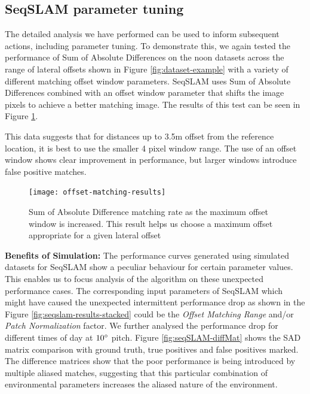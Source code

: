 \documentclass[letterpaper, 10 pt, conference]{ieeeconf}  %
\begin{document}
\subsection{SeqSLAM parameter tuning}

The detailed analysis we have performed can be used to inform subsequent actions, including parameter tuning. To demonstrate this, we again tested the performance of Sum of Absolute Differences on the noon datasets across the range of lateral offsets shown in Figure \ref{fig:dataset-example} with a variety of different matching offset window parameters. SeqSLAM uses Sum of Absolute Differences combined with an offset window parameter that shifts the image pixels to achieve a better matching image. The results of this test can be seen in Figure \ref{fig:offset-matching-param-results}.

This data suggests that for distances up to 3.5m offset from the reference location, it is best to use the smaller 4 pixel window range. The use of an offset window shows clear improvement in performance, but larger windows introduce false positive matches.

\begin{figure}[t]
    \centering
    \texttt{[image: offset-matching-results]}
    \caption{Sum of Absolute Difference matching rate as the maximum offset window is increased. This result helps us choose a maximum offset appropriate for a given lateral offset}
    \label{fig:offset-matching-param-results}
\end{figure}

\textbf{Benefits of Simulation:} The performance curves generated using simulated datasets for SeqSLAM show a peculiar behaviour for certain parameter values. This enables us to focus analysis of the algorithm on these unexpected performance cases. The corresponding input parameters of SeqSLAM which might have caused the unexpected intermittent performance drop as shown in the Figure \ref{fig:seqslam-results-stacked} could be the \emph{Offset Matching Range} and/or \emph{Patch Normalization} factor. We further analysed the performance drop for different times of day at $10\degree$ pitch. Figure \ref{fig:seqSLAM-diffMat} shows the SAD matrix comparison with ground truth, true positives and false positives marked. The difference matrices show that the poor performance is being introduced by multiple aliased matches, suggesting that this particular combination of environmental parameters increases the aliased nature of the environment.
\end{document}
